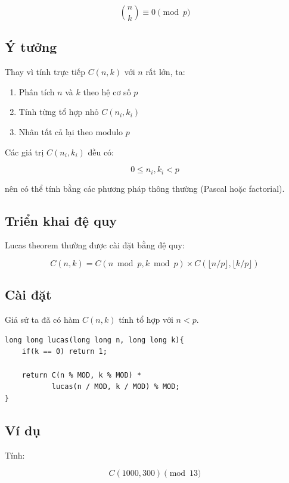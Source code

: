 \[
\binom{n}{k} \equiv 0 \pmod p
\]

\subsection*{Ý tưởng}

Thay vì tính trực tiếp $C(n,k)$ với $n$ rất lớn, ta:

\begin{enumerate}
\item Phân tích $n$ và $k$ theo hệ cơ số $p$
\item Tính từng tổ hợp nhỏ $C(n_i,k_i)$
\item Nhân tất cả lại theo modulo $p$
\end{enumerate}

Các giá trị $C(n_i,k_i)$ đều có:

\[
0 \le n_i, k_i < p
\]

nên có thể tính bằng các phương pháp thông thường (Pascal hoặc factorial).

\subsection*{Triển khai đệ quy}

Lucas theorem thường được cài đặt bằng đệ quy:

\[
C(n,k) =
C(n \bmod p, k \bmod p)
\times
C(\lfloor n/p \rfloor, \lfloor k/p \rfloor)
\]

\subsection*{Cài đặt}

Giả sử ta đã có hàm $C(n,k)$ tính tổ hợp với $n < p$.

\begin{tcolorbox}
\begin{verbatim}
long long lucas(long long n, long long k){
    if(k == 0) return 1;

    return C(n % MOD, k % MOD) *
           lucas(n / MOD, k / MOD) % MOD;
}
\end{verbatim}
\end{tcolorbox}

\subsection*{Ví dụ}

Tính:

\[
C(1000,300) \pmod 13
\]

